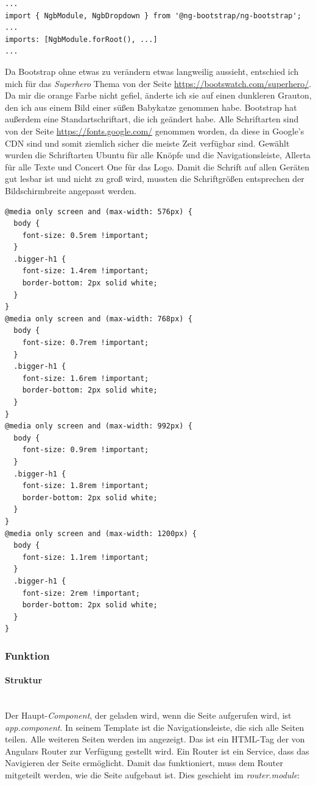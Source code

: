 \begin{lstlisting}[caption=app.module (Auszug) Importieren von ng-bootstrap,label=import-ng-bootstrap,style=TS]
...
import { NgbModule, NgbDropdown } from '@ng-bootstrap/ng-bootstrap';
...
imports: [NgbModule.forRoot(), ...]
...
\end{lstlisting}

Da Bootstrap ohne etwas zu verändern etwas langweilig aussieht, entschied ich mich für das \textit{Superhero} Thema von der Seite \url{https://bootswatch.com/superhero/}. Da mir die orange Farbe nicht gefiel, änderte ich sie auf einen dunkleren Grauton, den ich aus einem Bild einer süßen Babykatze genommen habe. Bootstrap hat außerdem eine Standartschriftart, die ich geändert habe. Alle Schriftarten sind von der Seite \url{https://fonts.google.com/} genommen worden, da diese in Google's \ac{CDN} sind und somit ziemlich sicher die meiste Zeit verfügbar sind. Gewählt wurden die Schriftarten Ubuntu für alle Knöpfe und die Navigationsleiste, Allerta für alle Texte und Concert One für das Logo. Damit die Schrift auf allen Geräten gut lesbar ist und nicht zu groß wird, mussten die Schriftgrößen entsprechen der Bildschirmbreite angepasst werden.

\begin{lstlisting}[caption=Schriftgrößen entsprechend der Bildschirmbreite,label=css-font-sizes,style=css]
@media only screen and (max-width: 576px) {
  body {
    font-size: 0.5rem !important;
  }
  .bigger-h1 {
    font-size: 1.4rem !important;
    border-bottom: 2px solid white;
  }
}
@media only screen and (max-width: 768px) {
  body {
    font-size: 0.7rem !important;
  }
  .bigger-h1 {
    font-size: 1.6rem !important;
    border-bottom: 2px solid white;
  }
}
@media only screen and (max-width: 992px) {
  body {
    font-size: 0.9rem !important;
  }
  .bigger-h1 {
    font-size: 1.8rem !important;
    border-bottom: 2px solid white;
  }
}
@media only screen and (max-width: 1200px) {
  body {
    font-size: 1.1rem !important;
  }
  .bigger-h1 {
    font-size: 2rem !important;
    border-bottom: 2px solid white;
  }
}
\end{lstlisting}



\subsubsection{Funktion}
\label{sec:ums-client-funktion}

\paragraph*{Struktur} \mbox {}\\
Der Haupt-\textit{Component}, der geladen wird, wenn die Seite aufgerufen wird, ist \textit{app.component}. In seinem Template ist die Navigationsleiste, die sich alle Seiten teilen. Alle weiteren Seiten werden im  angezeigt. Das ist ein \ac{HTML}-Tag der von Angulars Router zur Verfügung gestellt wird. Ein Router ist ein Service, dass das Navigieren der Seite ermöglicht. Damit das funktioniert, muss dem Router mitgeteilt werden, wie die Seite aufgebaut ist. Dies geschieht im \textit{router.module}:

